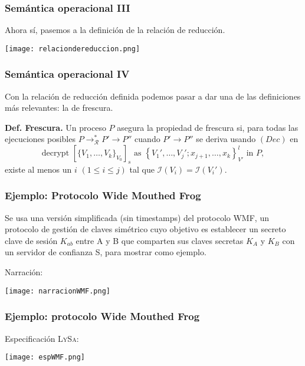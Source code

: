 \documentclass{beamer}
\begin{document}
\begin{frame}
    \frametitle{Semántica operacional III}
    \pause
    Ahora sí, pasemos a la definición de la relación de reducción.
    \pause[3]
    \begin{center}
        \texttt{[image: relaciondereduccion.png]}
    \end{center}
\end{frame}

\begin{frame}
    \frametitle{Semántica operacional IV}
    \pause
    Con la relación de reducción definida podemos pasar a dar una de las definiciones más relevantes: la de frescura.
    \pause[3]
    \vspace{0.7cm}
    
    \textbf{Def. Frescura.} Un proceso $P$ asegura la propiedad de frescura si, para todas las ejecuciones posibles $P \rightarrow^*_{\mathcal{R}} P' \rightarrow P''$ cuando $P' \rightarrow P''$ se deriva usando $(Dec)$ en
\[
\text{{decrypt }} [\{ V_1, \ldots, V_k\}_{V_0} ]_s \text{{ as }} \left\{ V_1', \ldots, V_j'; x_{j+1}, \ldots, x_k \right\}^l_{V'} \text{{ in }} P,
\]
existe al menos un $i$ $(1 \leq i \leq j)$ tal que $\mathcal{I}(V_i) = \mathcal{I}(V_i')$.

\end{frame}

\begin{frame}
    \frametitle{Ejemplo: Protocolo Wide Mouthed Frog}
    \pause
    Se usa una versión simplificada (sin timestamps) del protocolo WMF, un protocolo de gestión de claves simétrico cuyo objetivo es establecer un secreto
    clave de sesión $K_{ab}$ entre A y B que comparten sus claves secretas
    $K_A$ y $K_B$ con un servidor de confianza S, para mostrar como ejemplo.
    \pause[3]
    
    \vspace{0.5cm}
    Narración:
    \begin{center}
        \texttt{[image: narracionWMF.png]}
    \end{center}
\end{frame}

\begin{frame}
    \frametitle{Ejemplo: protocolo Wide Mouthed Frog}
    \pause
    Especificación L\textsc{y}S\textsc{a}:
    \pause[3]
    \begin{center}
        \texttt{[image: espWMF.png]}
    \end{center}
\end{frame}
\end{document}
